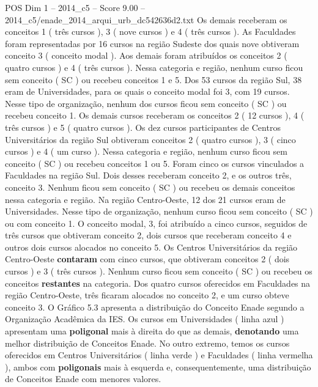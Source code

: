 \begin{textsample}{POS Dim 1 – 2014\_c5 – Score 9.00 – 2014\_c5/enade\_2014\_arqui\_urb\_dc542636d2.txt}
Os demais receberam os conceitos 1 ( três cursos ), 3 ( nove cursos ) e 4 ( três cursos ).
As Faculdades foram representadas por 16 cursos na região Sudeste dos quais nove obtiveram conceito 3 ( conceito modal ).
Aos demais foram atribuídos os conceitos 2 ( quatro cursos ) e 4 ( três cursos ).
Nessa categoria e região, nenhum curso ficou sem conceito ( SC ) ou recebeu conceitos 1 e 5.
Dos 53 cursos da região Sul, 38 eram de Universidades, para os quais o conceito modal foi 3, com 19 cursos.
Nesse tipo de organização, nenhum dos cursos ficou sem conceito ( SC ) ou recebeu conceito 1.
Os demais cursos receberam os conceitos 2 ( 12 cursos ), 4 ( três cursos ) e 5 ( quatro cursos ).
Os dez cursos participantes de Centros Universitários da região Sul obtiveram conceitos 2 ( quatro cursos ), 3 ( cinco cursos ) e 4 ( um curso ).
Nessa categoria e região, nenhum curso ficou sem conceito ( SC ) ou recebeu conceitos 1 ou 5.
Foram cinco os cursos vinculados a Faculdades na região Sul.
Dois desses receberam conceito 2, e os outros três, conceito 3.
Nenhum ficou sem conceito ( SC ) ou recebeu os demais conceitos nessa categoria e região.
Na região Centro-Oeste, 12 dos 21 cursos eram de Universidades.
Nesse tipo de organização, nenhum curso ficou sem conceito ( SC ) ou com conceito 1.
O conceito modal, 3, foi atribuído a cinco cursos, seguidos de três cursos que obtiveram conceito 2, dois cursos que receberam conceito 4 e outros dois cursos alocados no conceito 5.
Os Centros Universitários da região Centro-Oeste \textbf{contaram} com cinco cursos, que obtiveram conceitos 2 ( dois cursos ) e 3 ( três cursos ).
Nenhum curso ficou sem conceito ( SC ) ou recebeu os conceitos \textbf{restantes} na categoria.
Dos quatro cursos oferecidos em Faculdades na região Centro-Oeste, três ficaram alocados no conceito 2, e um curso obteve conceito 3.
O Gráfico 5.3 apresenta a distribuição do Conceito Enade segundo a Organização Acadêmica da IES.
Os cursos em Universidades ( linha azul ) apresentam uma \textbf{poligonal} mais à direita do que as demais, \textbf{denotando} uma melhor distribuição de Conceitos Enade.
No outro extremo, temos os cursos oferecidos em Centros Universitários ( linha verde ) e Faculdades ( linha vermelha ), ambos com \textbf{poligonais} mais à esquerda e, consequentemente, uma distribuição de Conceitos Enade com menores valores.

\end{textsample}
